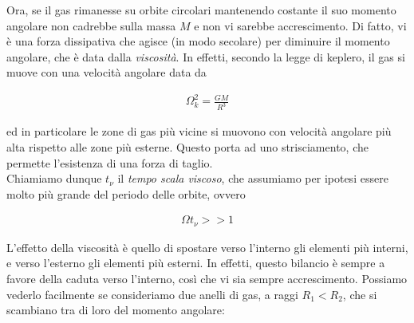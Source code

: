 \documentclass{report}
\begin{document}

Ora, se il gas rimanesse su orbite circolari mantenendo costante il suo momento angolare non cadrebbe sulla massa \(M\) e non vi sarebbe accrescimento. Di fatto, vi è una forza dissipativa che agisce (in modo secolare) per diminuire il momento angolare, che è data dalla \emph{viscosità}. In effetti, secondo la legge di keplero, il gas si muove con una velocità angolare data da 

\begin{align}
    \Omega_k^2 = \frac{GM}{R^3}
\end{align}

ed in particolare le zone di gas più vicine si muovono con velocità angolare più alta rispetto alle zone più esterne. Questo porta ad uno strisciamento, che permette l'esistenza di una forza di taglio. \\

Chiamiamo dunque \(t_{\nu}\) il \emph{tempo scala viscoso}, che assumiamo per ipotesi essere molto più grande del periodo delle orbite, ovvero 

\begin{align}
    \Omega t_{\nu} >> 1
\end{align}

L'effetto della viscosità è quello di spostare verso l'interno gli elementi più interni, e verso l'esterno gli elementi più esterni. In effetti, questo bilancio è sempre a favore della caduta verso l'interno, così che vi sia sempre accrescimento. Possiamo vederlo facilmente se consideriamo due anelli di gas, a raggi \(R_1 < R_2\), che si scambiano tra di loro del momento angolare: 
\end{document}
